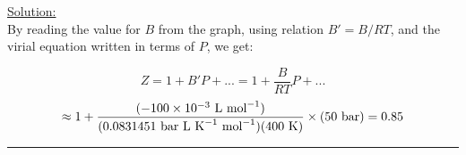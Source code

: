\noindent
\underline{Solution:}\\

By reading the value for $B$ from the graph, using relation $B' = B / RT$, and the virial equation written in terms of $P$, we get:

$$Z = 1 + B'P + ... = 1 + \frac{B}{RT}P + ...$$ 
$$\approx 1 + \frac{(-100\times 10^{-3}\textnormal{ L mol}^{-1})}{(0.0831451\textnormal{ bar L K}^{-1}\textnormal{ mol}^{-1})(400\textnormal{ K})}\times\left(50\textnormal{ bar}\right) = 0.85$$


\hrule\vspace{0.5cm}
